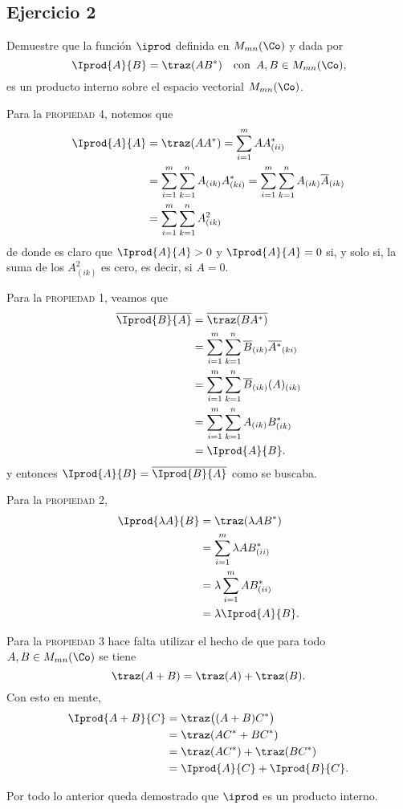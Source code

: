\subsection*{Ejercicio 2}
Demuestre que la función $\iprod$ definida en $M_{mn}(\Co)$ y dada por
\[ \Iprod{A}{B} = \traz(AB^\ast)\quad\text{con \,$A,B\in M_{mn}(\Co)$}, \]
es un producto interno sobre el espacio vectorial $M_{mn}(\Co)$.
\begin{sol}
	Para la \textsc{propiedad 4}, notemos que
	\begin{align*}
	\Iprod{A}{A}  &= \traz(AA^\ast) 
	= \sum_{i=1}^{m} AA^\ast_{(ii)} \\
	&= \sum_{i=1}^{m}\sum_{k=1}^{n} A_{(ik)}A^\ast_{(ki)} 
	= \sum_{i=1}^{m}\sum_{k=1}^{n} A_{(ik)}\overline{A}_{(ik)} \\
	&= \sum_{i=1}^{m}\sum_{k=1}^{n} A^2_{(ik)}
	\end{align*}
	de donde es claro que $\Iprod{A}{A}>0$ y $\Iprod{A}{A} = 0$ si, y solo si, la suma de los $A^2_{(ik)}$ es cero, es decir, si $A=0$.
	
		Para la \textsc{propiedad 1}, veamos que
	\begin{align*}
	\overline{\Iprod{B}{A}} &= \overline{\traz(BA^\ast)} \\
	&= \sum_{i=1}^{m}\sum_{k=1}^{n} \overline{B}_{(ik)}\overline{A^\ast}_{(ki)} \\
	&= \sum_{i=1}^{m}\sum_{k=1}^{n} \overline{B}_{(ik)} (A)_{(ik)} \\
	&= \sum_{i=1}^{m}\sum_{k=1}^{n} A_{(ik)}B_{(ik)}^\ast \\
	&= \Iprod{A}{B}.
	\end{align*}
	y entonces $\Iprod{A}{B} = \overline{\Iprod{B}{A}}$ como se buscaba.
	
	Para la \textsc{propiedad 2},
	\begin{align*}
		\Iprod{\lambda A}{B} &= \traz(\lambda AB^\ast) \\
							 &= \sum_{i=1}^{m} \lambda AB^\ast_{(ii)} \\
							 &= \lambda\sum_{i=1}^{m} AB^\ast_{(ii)} \\
							 &= \lambda\Iprod{A}{B}.
	\end{align*} 
	
	Para la \textsc{propiedad 3} hace falta utilizar el hecho de que para todo $A,B\in M_{mn}(\Co)$ se tiene
	\[ \traz(A+B) = \traz(A) + \traz(B). \]
	Con esto en mente, 
	\begin{align*}
		\Iprod{A+B}{C} &= \traz\big((A+B)C^\ast\big) \\
					   &= \traz(AC^\ast + BC^\ast) \\
					   &= \traz(AC^\ast) + \traz(BC^\ast) \\
					   &= \Iprod{A}{C} + \Iprod{B}{C}.
	\end{align*}
	
	Por todo lo anterior queda demostrado que $\iprod$ es un producto interno.
\end{sol}
